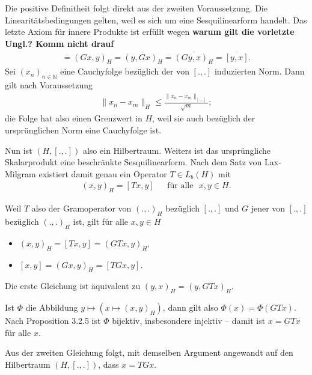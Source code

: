 \begin{solution}
  Die positive Definitheit folgt direkt aus der zweiten Voraussetzung. Die Linearitätsbedingungen gelten, weil es sich um eine Sesquilinearform handelt. Das letzte Axiom für innere Produkte ist erfüllt wegen \textbf{warum gilt die vorletzte Ungl.? Komm nicht drauf}
  \begin{align}
      [x, y] = (Gx, y)_H = \overline{(y, Gx)_H} = \overline{(Gy, x)_H} = \overline{[y, x]}.
  \end{align}
  Sei $(x_n)_{n \in \mathbb{N}}$ eine Cauchyfolge bezüglich der von $[.,.]$ induzierten Norm. Dann gilt nach Voraussetzung
  \begin{align}
      \|x_n - x_m\|_H \leq \frac{\|x_n - x_m\|_{[.,.]}}{\sqrt{m}};
  \end{align}
  die Folge hat also einen Grenzwert in $H$, weil sie auch bezüglich der ursprünglichen Norm eine Cauchyfolge ist.

  Nun ist $(H, [.,.])$ also ein Hilbertraum. Weiters ist das ursprüngliche Skalarprodukt eine beschränkte Sesquilinearform. Nach dem Satz von Lax-Milgram existiert damit genau ein Operator $T \in L_b(H)$ mit
  \begin{align}
      (x, y)_H = [Tx, y] ~~~~~~~ \text{für alle~~} x, y \in H.
  \end{align}

  Weil $T$ also der Gramoperator von $(.,.)_H$ bezüglich $[.,.]$ und $G$ jener von $[.,.]$ bezüglich $(.,.)_H$ ist, gilt für alle $x, y \in H$

  \begin{itemize}
      \item $(x, y)_H = [Tx, y] = (GTx, y)_H,$
      \item $[x, y] = (Gx, y)_H = [TGx, y].$
  \end{itemize}

  Die erste Gleichung ist äquivalent zu $(y, x)_H = (y, GTx)_H.$

  Ist $\Phi$ die Abbildung $y \mapsto (x \mapsto (x, y)_H)$, dann gilt also $\Phi(x) = \Phi(GTx)$. Nach Proposition 3.2.5 ist $\Phi$ bijektiv, insbesondere injektiv -- damit ist $x = GTx$ für alle $x$.

  Aus der zweiten Gleichung folgt, mit demselben Argument angewandt auf den Hilbertraum $(H, [.,.])$, dass $x = TGx.$
\end{solution}
